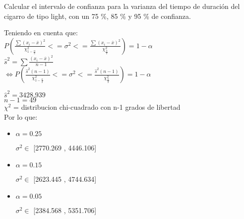 Calcular el intervalo de confianza para la varianza del tiempo de duraci\'on del cigarro de tipo light, con
un 75 \%, 85 \% y 95 \% de confianza.

Teniendo en cuenta que: \\

$P(\frac{\sum(x_i - \overline{x})^2}{\chi_{1-{\frac{\alpha}{2}}}^2} <= \sigma^2 <= \frac{\sum(x_i - \overline{x})^2}{\chi_{\frac{\alpha}{2}}^2}) = 1 - \alpha$\\

$\widehat{s}^2 = \sum \frac{(x_i - \overline{x})^2}{n-1}$\\

$\Leftrightarrow P(\frac{\widehat{s}^2 (n-1)}{\chi_{1-{\frac{\alpha}{2}}}^2} <= \sigma^2 <= \frac{\widehat{s}^2 (n-1)}{\chi_{\frac{\alpha}{2}}^2}) = 1 - \alpha$

$\widehat{s}^2 = 3428.939$\\
$n - 1 = 49$\\
$\chi^2$ = distribucion chi-cuadrado con n-1 grados de libertad\\

Por lo que: \\

\begin{itemize}

\item $\alpha = 0.25$

$\sigma^2 \in$ [2770.269 , 4446.106]

\item $\alpha = 0.15$

$\sigma^2 \in$ [2623.445 , 4744.634]

\item $\alpha = 0.05$

$\sigma^2 \in$ [2384.568 , 5351.706]

\end{itemize}
